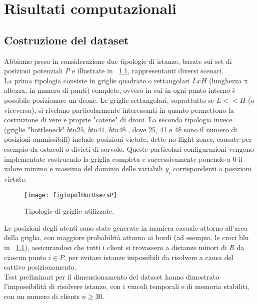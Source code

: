  \chapter{Risultati computazionali} \label{chap:risultati}

\ifpdf
    \graphicspath{{Chapter7/Figs/Raster/}{Chapter7/Figs/PDF/}{Chapter7/Figs/}}
\else
    \graphicspath{{Chapter7/Figs/Vector/}{Chapter7/Figs/}}
\fi

\section{Costruzione del dataset}
Abbiamo preso in considerazione due tipologie di istanze, basate sui set di posizioni potenziali $P$ e illustrate in \figurename\ \ref{figP}, rappresentanti diversi scenari. \\
La prima tipologia consiste in griglie quadrate o rettangolari $LxH$ (lunghezza x altezza, in numero di punti) complete, ovvero in cui in ogni punto interno è possibile posizionare un drone. Le griglie rettangolari, soprattutto se $L << H$ (o viceversa), si rivelano particolarmente interessanti in quanto permettono la costruzione di vere e proprie "catene" di droni. La seconda tipologia invece (griglie "bottleneck" $btn25$, $btn41$, $btn48$ \cite{degioPal2013}, dove 25, 41 e 48 sono il numero di posizioni ammissibili) include posizioni vietate, dette no-flight zones, causate per esempio da ostacoli o divieti di sorvolo. Queste particolari configurazioni vengono implementate costruendo la griglia completa e successivamente ponendo a 0 il valore minimo e massimo del dominio delle variabili $y_i$ corrispondenti a posizioni vietate.\\
%
\begin{figure}
	\begin{center}
		\texttt{[image: figTopolHorUsersP]}
	\end{center}
	\caption{Tipologie di griglie utilizzate.} \label{figP}
\end{figure}
%
Le posizioni degli utenti sono state generate in maniera casuale attorno all'area della griglia, con maggiore probabilità attorno ai bordi (ad esempio, le croci blu in \figurename\ \ref{figP}), assicurandosi che tutti i client si trovassero a distanze minori di $R$ da ciascun punto $i \in P$, per evitare istanze impossibili da risolvere a causa del cattivo posizionamento. \\
Test preliminari per il dimensionamento del dataset hanno dimostrato l'impossibilità di risolvere istanze, con i vincoli temporali e di memoria stabiliti, con un numero di clients $n \geq 30$. \\
